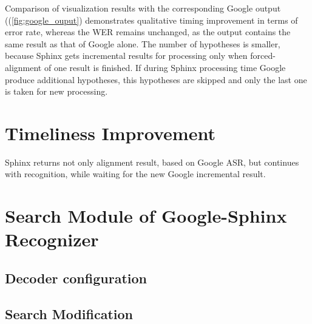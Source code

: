 Comparison of visualization results with the corresponding Google
output ((\ref{fig:google_ouput}) demonstrates qualitative timing improvement in terms
of error rate, whereas the WER remains unchanged, as the output contains the
same result as that of Google alone. The number of hypotheses is smaller,
because Sphinx gets incremental results for processing only when
forced-alignment of one result is finished.  If during Sphinx processing time
Google produce additional hypotheses, this hypotheses are skipped and only the
last one is taken for new processing. 


\section {Timeliness Improvement}
Sphinx returns not only alignment result, based on Google ASR, but continues
with recognition, while waiting for the new Google incremental result. 

\section {Search Module of Google-Sphinx Recognizer}
\subsection {Decoder configuration}
\subsection {Search Modification}